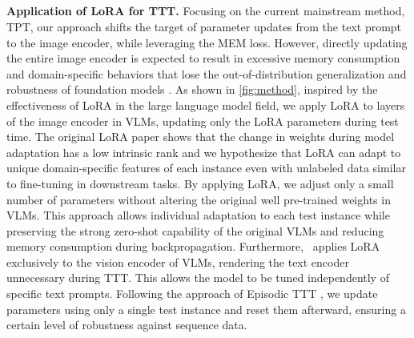 \subsection{\name}

\textbf{Application of LoRA for TTT.}\hspace{5mm}
Focusing on the current mainstream method, TPT, our approach shifts the target of parameter updates from the text prompt to the image encoder, while leveraging the MEM loss.
However, directly updating the entire image encoder is expected to result in excessive memory consumption and domain-specific behaviors that lose the out-of-distribution generalization and robustness of foundation models \citep{wortsman2022robust, kumar2022fine}. %
As shown in \cref{fig:method}, inspired by the effectiveness of LoRA in the large language model field, we apply LoRA to layers of the image encoder in VLMs, updating only the LoRA parameters during test time.
The original LoRA paper shows that the change in weights during model adaptation has a low intrinsic rank and we hypothesize that LoRA can adapt to unique domain-specific features of each instance even with unlabeled data similar to fine-tuning in downstream tasks.
By applying LoRA, we adjust only a small number of parameters without altering the original well pre-trained weights in VLMs.
This approach allows individual adaptation to each test instance while preserving the strong zero-shot capability of the original VLMs and reducing memory consumption during backpropagation.
Furthermore, \name\ applies LoRA exclusively to the vision encoder of VLMs, rendering the text encoder unnecessary during TTT.
This allows the model to be tuned independently of specific text prompts.
Following the approach of Episodic TTT \citep{wang2020tent,shu2022test,zhao2023test}, we update parameters using only a single test instance and reset them afterward, ensuring a certain level of robustness against sequence data.
\newline

